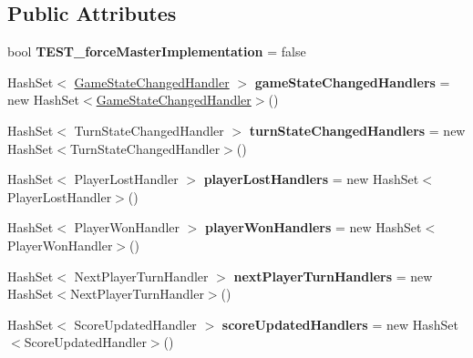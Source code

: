 \subsection*{Public Attributes}
\begin{DoxyCompactItemize}
\item 
bool {\bfseries T\+E\+S\+T\+\_\+force\+Master\+Implementation} = false\hypertarget{class_tower_v_r_1_1_tower_game_manager_a8e6cdf3d57bac1f8fdcfe01094180d07}{}\label{class_tower_v_r_1_1_tower_game_manager_a8e6cdf3d57bac1f8fdcfe01094180d07}

\item 
Hash\+Set$<$ \hyperlink{class_tower_v_r_1_1_tower_game_manager_a4bfd43a7fbaab6c26aa918ff220f11f8}{Game\+State\+Changed\+Handler} $>$ {\bfseries game\+State\+Changed\+Handlers} = new Hash\+Set$<$\hyperlink{class_tower_v_r_1_1_tower_game_manager_a4bfd43a7fbaab6c26aa918ff220f11f8}{Game\+State\+Changed\+Handler}$>$()\hypertarget{class_tower_v_r_1_1_tower_game_manager_ab98615edfe6e6cc3f8a021104ad83c30}{}\label{class_tower_v_r_1_1_tower_game_manager_ab98615edfe6e6cc3f8a021104ad83c30}

\item 
Hash\+Set$<$ Turn\+State\+Changed\+Handler $>$ {\bfseries turn\+State\+Changed\+Handlers} = new Hash\+Set$<$Turn\+State\+Changed\+Handler$>$()\hypertarget{class_tower_v_r_1_1_tower_game_manager_aa659bd7720f3cfa335b291f30b7391bb}{}\label{class_tower_v_r_1_1_tower_game_manager_aa659bd7720f3cfa335b291f30b7391bb}

\item 
Hash\+Set$<$ Player\+Lost\+Handler $>$ {\bfseries player\+Lost\+Handlers} = new Hash\+Set$<$Player\+Lost\+Handler$>$()\hypertarget{class_tower_v_r_1_1_tower_game_manager_a2bc2fd34f8a424f9ebdbea79b282f6ee}{}\label{class_tower_v_r_1_1_tower_game_manager_a2bc2fd34f8a424f9ebdbea79b282f6ee}

\item 
Hash\+Set$<$ Player\+Won\+Handler $>$ {\bfseries player\+Won\+Handlers} = new Hash\+Set$<$Player\+Won\+Handler$>$()\hypertarget{class_tower_v_r_1_1_tower_game_manager_ae676d69dff124b0d9c2e940b75588f8d}{}\label{class_tower_v_r_1_1_tower_game_manager_ae676d69dff124b0d9c2e940b75588f8d}

\item 
Hash\+Set$<$ Next\+Player\+Turn\+Handler $>$ {\bfseries next\+Player\+Turn\+Handlers} = new Hash\+Set$<$Next\+Player\+Turn\+Handler$>$()\hypertarget{class_tower_v_r_1_1_tower_game_manager_a129dec36b93852d13853309a2afad23d}{}\label{class_tower_v_r_1_1_tower_game_manager_a129dec36b93852d13853309a2afad23d}

\item 
Hash\+Set$<$ Score\+Updated\+Handler $>$ {\bfseries score\+Updated\+Handlers} = new Hash\+Set$<$Score\+Updated\+Handler$>$()\hypertarget{class_tower_v_r_1_1_tower_game_manager_a8acf4a1219084e55e0c2a92eddf5cdf0}{}\label{class_tower_v_r_1_1_tower_game_manager_a8acf4a1219084e55e0c2a92eddf5cdf0}

\end{DoxyCompactItemize}
